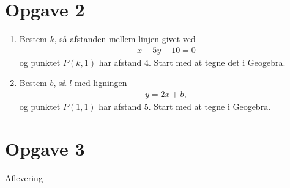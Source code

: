 \section*{Opgave 2}
\begin{enumerate}[label=\roman*)]
\item Bestem $k$, så afstanden mellem linjen givet ved 
\begin{align*}
x-5y+10 = 0
\end{align*}
og punktet $P(k,1)$ har afstand $4$. Start med at tegne det i Geogebra.
\item Bestem $b$, så $l$ med ligningen
\begin{align*}
y = 2x+b,
\end{align*}
 og punktet $P(1,1)$ har afstand 5. Start med at tegne i Geogebra.
\end{enumerate}

\section*{Opgave 3}
Aflevering